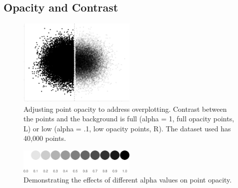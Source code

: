 \documentclass[manuscript, review, anonymous, screen]{acmart}
\begin{document}
\hypertarget{sec-transparency-and-contrast}{%
\subsection{Opacity and Contrast}\label{sec-transparency-and-contrast}}

\begin{figure}

\includegraphics[width=0.5\textwidth,height=\textheight]{size_and_opacity_files/figure-pdf/fig-overplotting-examples-1.pdf} \hfill{}

\caption{\label{fig-overplotting-examples}Adjusting point opacity to
address overplotting. Contrast between the points and the background is
full (alpha = 1, full opacity points, L) or low (alpha = .1, low opacity
points, R). The dataset used has 40,000 points.}

\end{figure}

\begin{figure}

\includegraphics[width=0.5\textwidth,height=\textheight]{size_and_opacity_files/figure-pdf/fig-alpha-examples-1.pdf} \hfill{}

\caption{\label{fig-alpha-examples}Demonstrating the effects of
different alpha values on point opacity.}

\end{figure}
\end{document}
